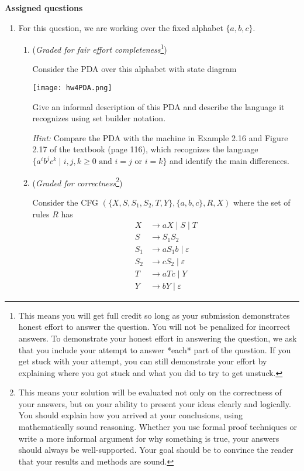 \documentclass[12pt, oneside]{article}
\begin{document}
\newpage
{\bf Assigned questions}
\begin{enumerate}
    \item For this question, we are working over the fixed alphabet $\{a,b,c\}$.

    \begin{enumerate}
        \item ({\it Graded for fair effort completeness}\footnote{This means 
        you will get full credit so long as your submission demonstrates honest 
        effort to answer the question. You will not be penalized for incorrect answers. 
        To demonstrate your honest effort in answering the question, we ask that you 
        include your attempt to answer *each* part of the question. If you get stuck 
        with your attempt, you can still demonstrate your effort by explaining where 
        you got stuck and what you did to try to get unstuck.})

    Consider the PDA over this alphabet with state diagram
        \begin{center}
        \texttt{[image: hw4PDA.png]}
        \end{center}

    Give an informal description of this PDA and describe the language it recognizes using 
    set builder notation.

    {\it Hint:} Compare the PDA with the machine in Example 2.16 and Figure 2.17 
    of the textbook (page 116), which recognizes 
    the language $\{a^i b^j c^k \mid i,j,k \geq 0 \textrm{ and } i=j \textrm{ or } i=k\}$ and 
    identify the main differences. 

    \item  ({\it Graded for correctness}\footnote{This means your solution will be
    evaluated not only on the correctness of your answers, but on your ability to 
    present your ideas clearly and logically. You should explain how you arrived at 
    your conclusions, using  mathematically sound reasoning. Whether you use formal proof techniques or 
    write a more informal argument for why 
    something is true, your answers should always be well-supported. Your goal 
    should be to convince the reader that 
    your results and methods are sound.}) 

    Consider the CFG $(\{X, S, S_1, S_2, T, Y\}, \{a,b,c\}, R, X)$ where the set of rules $R$ has
    \begin{align*}
        X &\to aX \mid S \mid T \\
        S &\to S_1S_2 \\
        S_1 &\to aS_1 b \mid \varepsilon \\
        S_2 &\to cS_2 \mid \varepsilon\\
        T &\to aTc \mid Y \\
        Y &\to bY \mid \varepsilon
    \end{align*}


\end{enumerate}
\end{enumerate}
\end{document}
